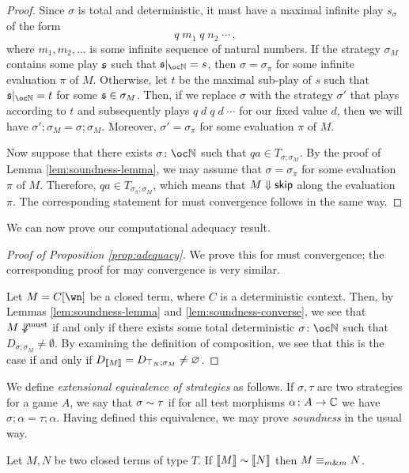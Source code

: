 \documentclass[sigplan,10pt,review]{acmart}\settopmatter{printfolios=true,printccs=false,printacmref=false}
\begin{document}
\begin{proof}
  Since $\sigma$ is total and deterministic, it must have a maximal infinite play $s_\sigma$ of the form
  \[
    q\;m_1\;q\;n_2\;\cdots\,,
    \]
  where $m_1,m_2,\dots$ is some infinite sequence of natural numbers.  
  If the strategy $\sigma_M$ contains some play $\mathfrak s$ such that $\s\vert_{\oc\bN}=s$, then $\sigma=\sigma_\pi$ for some infinite evaluation $\pi$ of $M$.  
  Otherwise, let $t$ be the maximal sub-play of $s$ such that $\s\vert_{\oc\bN}=t$ for some $\mathfrak s\in\sigma_M$.  
  Then, if we replace $\sigma$ with the strategy $\sigma'$ that plays according to $t$ and subsequently plays $q\;d\;q\;d\;\cdots$ for our fixed value $d$, then we will have $\sigma';\sigma_M=\sigma;\sigma_M$.  
  Moreover, $\sigma'=\sigma_\pi$ for some evaluation $\pi$ of $M$.

  Now suppose that there exists $\sigma\from\oc\bN$ such that $qa\in T_{\sigma;\sigma_M}$.  
  By the proof of Lemma \ref{lem:soundness-lemma}, we may assume that $\sigma=\sigma_\pi$ for some evaluation $\pi$ of $M$.  
  Therefore, $qa\in T_{\sigma_\pi;\sigma_M}$, which means that $M\Downarrow{\mathsf{skip}}$ along the evaluation $\pi$.  
  The corresponding statement for must convergence follows in the same way.
\end{proof}

We can now prove our computational adequacy result.

\begin{proof}[Proof of Proposition \ref{prop:adequacy}]
  We prove this for must convergence; the corresponding proof for may convergence is very similar.

  Let $M=C[\wn]$ be a closed term, where $C$ is a deterministic context.  
  Then, by Lemmas \ref{lem:soundness-lemma} and \ref{lem:soundness-converse}, we see that $M\not\Downarrow^{\text{must}}$ if and only if there exists some total deterministic $\sigma\from\oc\bN$ such that $D_{\sigma;\sigma_M}\ne\emptyset$.  
  By examining the definition of composition, we see that this is the case if and only if $D_{\left\llbracket M\right\rrbracket}=D_{\top_N;\sigma_M}\ne\varnothing$.
\end{proof}

We define \emph{extensional equivalence of strategies} as follows.  
If $\sigma,\tau$ are two strategies for a game $A$, we say that $\sigma\sim\tau$ if for all test morphisms $\alpha\colon A \to \mathbb{C}$ we have $\sigma;\alpha=\tau;\alpha$.  
Having defined this equivalence, we may prove \emph{soundness} in the usual way.

\begin{theorem}[Soundness]
  Let $M,N$ be two closed terms of type $T$.  
  If $\left\llbracket M\right\rrbracket\sim\left\llbracket N\right\rrbracket$ then $M\equiv_{m\&m} N$.  
\end{theorem}
\end{document}
